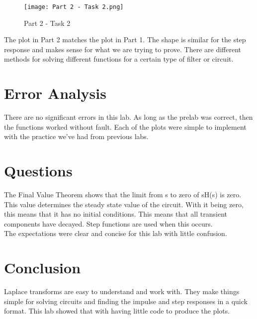 \documentclass[12pt]{report}
\begin{document}
\begin{figure}[ht]
\begin{center}
\texttt{[image: Part 2 - Task 2.png]}
\caption{Part 2 - Task 2}
\end{center}
\end{figure}

\noindent The plot in Part 2 matches the plot in Part 1. The shape is similar for the step response and makes sense for what we are trying to prove. There are different methods for solving different functions for a certain type of filter or circuit. 

\section{Error Analysis}
\noindent There are no significant errors in this lab. As long as the prelab was correct, then the functions worked without fault. Each of the plots were simple to implement with the practice we've had from previous labs. 

\section{Questions}
\noindent The Final Value Theorem shows that the limit from s to zero of sH(s) is zero. This value determines the steady state value of the circuit. With it being zero, this means that it has no initial conditions. This means that all transient components have decayed. Step functions are used when this occurs. \\

\noindent The expectations were clear and concise for this lab with little confusion. 

\section{Conclusion}
\noindent Laplace transforms are easy to understand and work with. They make things simple for solving circuits and finding the impulse and step responses in a quick format. This lab showed that with having little code to produce the plots. 
\end{document}
